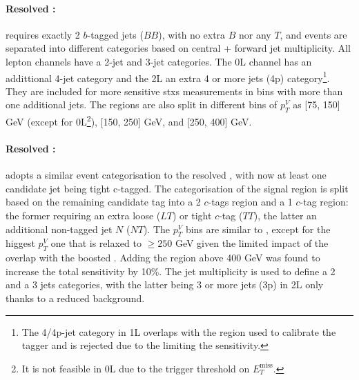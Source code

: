 \paragraph{Resolved \vhb:} requires exactly 2 $b$-tagged jets ($BB$), with no extra $B$ nor any $T$, and events are separated into different categories based on central + forward jet multiplicity. All lepton channels have a 2-jet and 3-jet categories. The 0L channel has an addittional 4-jet category and the 2L an extra 4 or more jets (4p) category\footnote{The 4/4p-jet category in 1L overlaps with the region used to calibrate the tagger and is rejected due to the \ttb limiting the sensitivity.}. They are included for more sensitive \gls{stxs} measurements in bins with more than one additional jets. The regions are also split in different bins of $p_T^V$ as [75, 150] GeV (except for 0L\footnote{It is not feasible in 0L due to the trigger threshold on $E_T^{\textrm{miss}}$.}), [150, 250] GeV, and [250, 400] GeV.

\paragraph{Resolved \vhc:} adopts a similar event categorisation to the resolved \vhb, with now at least one candidate jet being tight c-tagged. The categorisation of the signal region is split based on the remaining candidate tag into a 2 $c$-tags region and a 1 $c$-tag region: the former requiring an extra loose ($LT$) or tight $c$-tag ($TT$), the latter an additional non-tagged jet $N$ ($NT$). The $p_T^V$ bins are similar to \vhb, except for the higgest $p_T^V$ one that is relaxed to $\geq 250$ GeV given the limited impact of the overlap with the boosted \vhb. Adding the \ptv region above 400 GeV was found to increase the total \vhc sensitivity by 10\%. The jet multiplicity is used to define a 2 and a 3 jets categories, with the latter being 3 or more jets (3p) in 2L only thanks to a reduced \ttb background.

